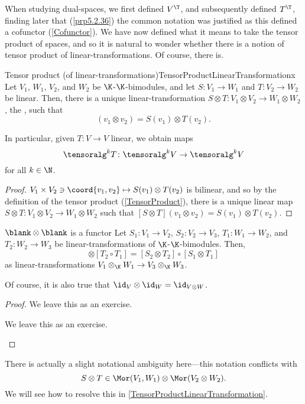 When studying dual-spaces, we first defined $V^{\T}$, and subsequently defined $T^{\T}$, finding later that (\cref{prp5.2.36}) the common notation was justified as this defined a cofunctor (\cref{Cofunctor}).  We have now defined what it means to take the tensor product of spaces, and so it is natural to wonder whether there is a notion of tensor product of linear-transformations.  Of course, there is.
\begin{thm}{Tensor product (of linear-transform\-ations)}{TensorProductLinearTransformationx}
	Let $V_1$, $W_1$, $V_2$, and $W_2$ be $\K$-$\K$-bimodules, and let $S\colon V_1\rightarrow W_1$ and $T\colon V_2\rightarrow W_2$ be linear.  Then, there is a unique linear-transformation $S\otimes T\colon V_1\otimes V_2\rightarrow W_1\otimes W_2$, the , such that
	\begin{equation}
	[S\otimes T](v_1\otimes v_2)=S(v_1)\otimes T(v_2).
	\end{equation}
	\begin{rmk}
		In particular, given $T\colon V\rightarrow V$ linear, we obtain maps
		\begin{equation}
			\tensoralg ^kT\colon \tensoralg ^kV\rightarrow \tensoralg ^kV
		\end{equation}
		for all $k\in \N$.
	\end{rmk}
	\begin{proof}
		$V_1\times V_2\ni \coord{v_1,v_2}\mapsto S(v_1)\otimes T(v_2)$ is bilinear, and so by the definition of the tensor product (\cref{TensorProduct}), there is a unique linear map $S\otimes T\colon V_1\otimes V_2\rightarrow W_1\otimes W_2$ such that $[S\otimes T](v_1\otimes v_2)=S(v_1)\otimes T(v_2)$.
\end{proof}
\end{thm}
\begin{thm}{$\blank \otimes \blank$ is a functor}{}
Let $S_1\colon V_1\rightarrow V_2$, $S_2\colon V_2\rightarrow V_3$, $T_1\colon W_1\rightarrow W_2$, and $T_2\colon W_2\rightarrow W_3$ be linear-transformations of $\K$-$\K$-bimodules.  Then,
\begin{equation}
[S_2\circ S_1]\otimes [T_2\circ T_1]=[S_2\otimes T_2]\circ [S_1\otimes T_1]
\end{equation}
as linear-transformations $V_1\otimes _{\K}W_1\rightarrow V_3\otimes _{\K}W_3$.
\begin{rmk}
	Of course, it is also true that $\id _V\otimes \id _W=\id _{V\otimes W}$.
\end{rmk}
\begin{proof}
	We leave this as an exercise.
	\begin{exr}[breakable=false]{}{}
		We leave this as an exercise.
	\end{exr}
\end{proof}
\end{thm}
There is actually a slight notational ambiguity here---this notation conflicts with
\begin{equation}
	S\otimes T\in \Mor (V_1,W_1)\otimes \Mor (V_2\otimes W_2).
\end{equation}
We will see how to resolve this in \cref{TensorProductLinearTransformation}.

